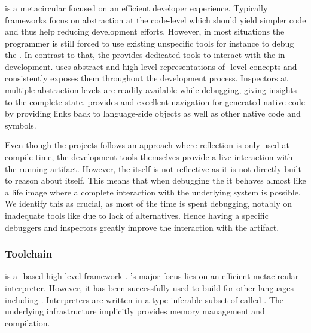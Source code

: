 \subsubsection*{\Maxine \Java \VM}
\Maxine is a metacircular \Java \VM \cite{Wimm13a} focused on an efficient developer experience.
Typically \VM frameworks focus on abstraction at the code-level which should yield simpler code and thus help reducing development efforts.
However, in most situations the programmer is still forced to use existing unspecific tools for instance to debug the \VM.
In contrast to that, the \Maxine \VM provides dedicated tools to interact with the \VM in development.
\Maxine uses abstract and high-level representations of \VM-level concepts and consistently exposes them throughout the development process.
Inspectors at multiple abstraction levels are readily available while debugging, giving insights to the complete \VM state.
\Maxine provides and excellent navigation for generated native code by providing links back to language-side objects as well as other native code and symbols.

Even though the \Maxine projects follows an approach where reflection is only used at compile-time, the development tools themselves provide a live interaction with the running \VM artifact.
However, the \VM itself is not reflective as it is not directly built to reason about itself.
This means that when debugging the \VM it behaves almost like a life \ST image where a complete interaction with the underlying system is possible.
We identify this as crucial, as most of the time is spent debugging, notably on inadequate tools like  due to lack of alternatives.
Hence having a specific debuggers and inspectors greatly improve the interaction with the \VM artifact.

\subsubsection*{\PyPy Toolchain}
 is a \Python-based high-level \VM framework \cite{Rigo06a}.
\PyPy's major focus lies on an efficient metacircular \Python interpreter.
However, it has been successfully used to build \VMs for other languages including \ST \cite{Bolz08a}.
Interpreters are written in a type-inferable subset of \Python called \RPython.
The underlying \PyPy infrastructure implicitly provides memory management and \JIT compilation.

